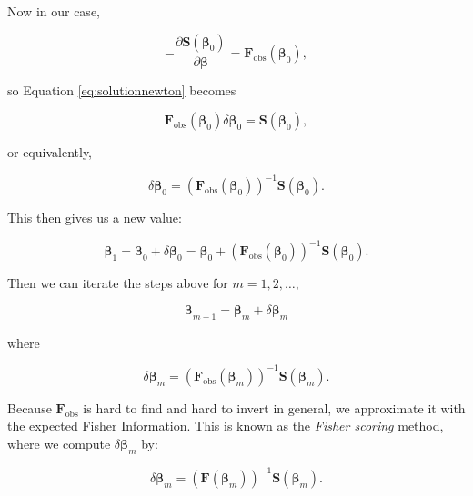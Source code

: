 \documentclass[
  12pt,
]{book}
\begin{document}
Now in our case,

\begin{equation}
  -\frac{\partial \boldsymbol{S}(\boldsymbol{\beta}_{0})}{\partial\boldsymbol{\beta}}
  = \boldsymbol{F}_{\text{obs}}(\boldsymbol{\beta}_{0}),
\end{equation}

so Equation \eqref{eq:solutionnewton} becomes

\begin{equation}
  \boldsymbol{F}_{\text{obs}}(\boldsymbol{\beta}_{0})\delta\boldsymbol{\beta}_{0}
  = \boldsymbol{S}(\boldsymbol{\beta}_{0}),
\end{equation}

or equivalently,

\begin{equation}
  \delta\boldsymbol{\beta}_{0}
  = \left( \boldsymbol{F}_{\text{obs}}(\boldsymbol{\beta}_{0}) \right)^{-1} \boldsymbol{S}(\boldsymbol{\beta}_{0}).
\end{equation}

This then gives us a new value:

\begin{equation}
  \boldsymbol{\beta}_{1} 
  = \boldsymbol{\beta}_{0} + \delta\boldsymbol{\beta}_{0}
  = \boldsymbol{\beta}_{0} + 
    \left( \boldsymbol{F}_{\text{obs}}(\boldsymbol{\beta}_{0}) \right)^{-1} \boldsymbol{S}(\boldsymbol{\beta}_{0}).
\end{equation}

Then we can iterate the steps above for \(m = 1, 2, \ldots,\)

\begin{equation}
  \boldsymbol{\beta}_{m+1} = \boldsymbol{\beta}_{m} + \delta\boldsymbol{\beta}_{m} 
\end{equation}

where

\begin{equation}
  \delta\boldsymbol{\beta}_{m}
  = \left( \boldsymbol{F}_{\text{obs}}(\boldsymbol{\beta}_{m}) \right)^{-1}
    \boldsymbol{S}(\boldsymbol{\beta}_{m}).
\end{equation}

Because \(\boldsymbol{F}_{\text{obs}}\) is hard to find and hard to invert in general, we approximate it with the expected Fisher Information. This is known as the \emph{Fisher scoring} method, where we compute \(\delta\boldsymbol{\beta}_{m}\) by:

\begin{equation}
  \delta\boldsymbol{\beta}_{m}
  = \left( \boldsymbol{F}(\boldsymbol{\beta}_{m}) \right)^{-1} \boldsymbol{S}(\boldsymbol{\beta}_{m}).
  \label{eq:fisherscoring}
\end{equation}
\end{document}
